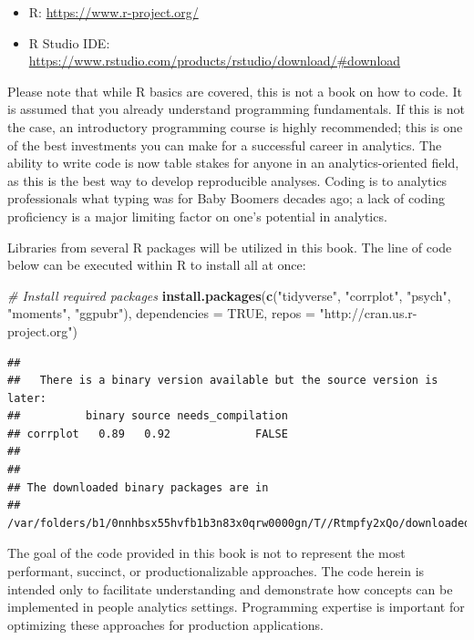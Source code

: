 \documentclass[]{book}
\newenvironment{Shaded}{\begin{snugshade}}{\end{snugshade}}
\newcommand{\CommentTok}[1]{\textcolor[rgb]{0.56,0.35,0.01}{\textit{#1}}}
\newcommand{\DataTypeTok}[1]{\textcolor[rgb]{0.13,0.29,0.53}{#1}}
\newcommand{\KeywordTok}[1]{\textcolor[rgb]{0.13,0.29,0.53}{\textbf{#1}}}
\newcommand{\NormalTok}[1]{#1}
\newcommand{\OtherTok}[1]{\textcolor[rgb]{0.56,0.35,0.01}{#1}}
\newcommand{\StringTok}[1]{\textcolor[rgb]{0.31,0.60,0.02}{#1}}
\providecommand{\tightlist}{%
  \setlength{\itemsep}{0pt}\setlength{\parskip}{0pt}}
\begin{document}
\begin{itemize}
\tightlist
\item
  R: \url{https://www.r-project.org/}
\item
  R Studio IDE: \url{https://www.rstudio.com/products/rstudio/download/\#download}
\end{itemize}

Please note that while R basics are covered, this is not a book on how to code. It is assumed that you already understand programming fundamentals. If this is not the case, an introductory programming course is highly recommended; this is one of the best investments you can make for a successful career in analytics. The ability to write code is now table stakes for anyone in an analytics-oriented field, as this is the best way to develop reproducible analyses. Coding is to analytics professionals what typing was for Baby Boomers decades ago; a lack of coding proficiency is a major limiting factor on one's potential in analytics.

Libraries from several R packages will be utilized in this book. The line of code below can be executed within R to install all at once:

\begin{Shaded}
\begin{Highlighting}[]
\CommentTok{# Install required packages}
\KeywordTok{install.packages}\NormalTok{(}\KeywordTok{c}\NormalTok{(}\StringTok{"tidyverse"}\NormalTok{, }\StringTok{"corrplot"}\NormalTok{, }\StringTok{"psych"}\NormalTok{, }\StringTok{"moments"}\NormalTok{, }\StringTok{"ggpubr"}\NormalTok{), }\DataTypeTok{dependencies =} \OtherTok{TRUE}\NormalTok{, }\DataTypeTok{repos =} \StringTok{"http://cran.us.r-project.org"}\NormalTok{)}
\end{Highlighting}
\end{Shaded}

\begin{verbatim}
## 
##   There is a binary version available but the source version is later:
##          binary source needs_compilation
## corrplot   0.89   0.92             FALSE
## 
## 
## The downloaded binary packages are in
##  /var/folders/b1/0nnhbsx55hvfb1b3n83x0qrw0000gn/T//Rtmpfy2xQo/downloaded_packages
\end{verbatim}

The goal of the code provided in this book is not to represent the most performant, succinct, or productionalizable approaches. The code herein is intended only to facilitate understanding and demonstrate how concepts can be implemented in people analytics settings. Programming expertise is important for optimizing these approaches for production applications.
\end{document}
